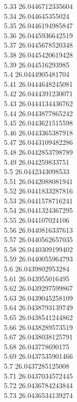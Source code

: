 {5.33	26.0446712335604\\
5.34	26.044645355024\\
5.35	26.0446194985847\\
5.36	26.0445936642519\\
5.37	26.0445678520348\\
5.38	26.0445420619428\\
5.39	26.044516293985\\
5.4	26.0444905481704\\
5.41	26.0444648245081\\
5.42	26.0444391230071\\
5.43	26.0444134436762\\
5.44	26.0443877865242\\
5.45	26.0443621515598\\
5.46	26.0443365387918\\
5.47	26.0443109482286\\
5.48	26.0442853798789\\
5.49	26.044259833751\\
5.5	26.0442343098533\\
5.51	26.0442088081941\\
5.52	26.0441833287816\\
5.53	26.0441578716241\\
5.54	26.0441324367295\\
5.55	26.044107024106\\
5.56	26.0440816337613\\
5.57	26.0440562657035\\
5.58	26.0440309199402\\
5.59	26.0440055964793\\
5.6	26.0439802953284\\
5.61	26.043955016495\\
5.62	26.0439297599867\\
5.63	26.0439045258109\\
5.64	26.0438793139749\\
5.65	26.0438541244862\\
5.66	26.0438289573519\\
5.67	26.0438038125791\\
5.68	26.043778690175\\
5.69	26.0437535901466\\
5.7	26.0437285125008\\
5.71	26.0437034572445\\
5.72	26.0436784243844\\
5.73	26.0436534139274\\
}

